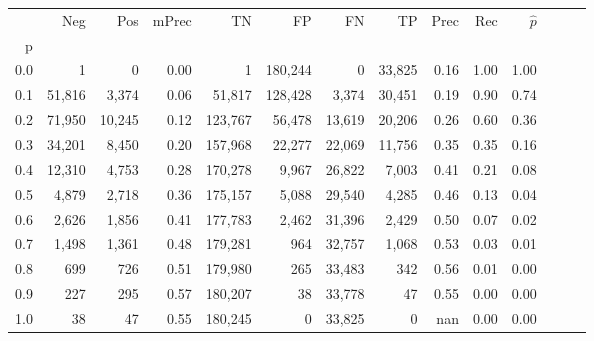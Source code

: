 \begin{tabular}{rrrrrrrrrrrrrr}
\toprule
{} &     Neg &     Pos & mPrec &       TN &       FP &      FN &      TP &  Prec &   Rec & $\hat{p}$ \\
p   &         &         &       &          &          &         &         &       &       &           \\
\midrule
0.0 &       1 &       0 &  0.00 &        1 &  180,244 &       0 &  33,825 &  0.16 &  1.00 &      1.00 \\
0.1 &  51,816 &   3,374 &  0.06 &   51,817 &  128,428 &   3,374 &  30,451 &  0.19 &  0.90 &      0.74 \\
0.2 &  71,950 &  10,245 &  0.12 &  123,767 &   56,478 &  13,619 &  20,206 &  0.26 &  0.60 &      0.36 \\
0.3 &  34,201 &   8,450 &  0.20 &  157,968 &   22,277 &  22,069 &  11,756 &  0.35 &  0.35 &      0.16 \\
0.4 &  12,310 &   4,753 &  0.28 &  170,278 &    9,967 &  26,822 &   7,003 &  0.41 &  0.21 &      0.08 \\
0.5 &   4,879 &   2,718 &  0.36 &  175,157 &    5,088 &  29,540 &   4,285 &  0.46 &  0.13 &      0.04 \\
0.6 &   2,626 &   1,856 &  0.41 &  177,783 &    2,462 &  31,396 &   2,429 &  0.50 &  0.07 &      0.02 \\
0.7 &   1,498 &   1,361 &  0.48 &  179,281 &      964 &  32,757 &   1,068 &  0.53 &  0.03 &      0.01 \\
0.8 &     699 &     726 &  0.51 &  179,980 &      265 &  33,483 &     342 &  0.56 &  0.01 &      0.00 \\
0.9 &     227 &     295 &  0.57 &  180,207 &       38 &  33,778 &      47 &  0.55 &  0.00 &      0.00 \\
1.0 &      38 &      47 &  0.55 &  180,245 &        0 &  33,825 &       0 &   nan &  0.00 &      0.00 \\
\bottomrule
\end{tabular}
